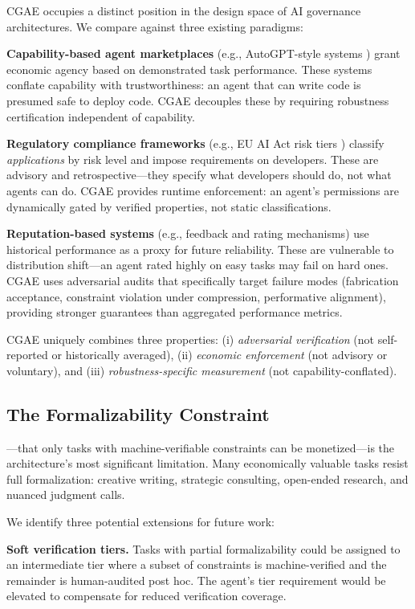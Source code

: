 \documentclass[11pt,a4paper]{article}
\begin{document}
CGAE occupies a distinct position in the design space of AI governance architectures. We compare against three existing paradigms:

\textbf{Capability-based agent marketplaces} (e.g., AutoGPT-style systems \citep{wu2023autogen}) grant economic agency based on demonstrated task performance. These systems conflate capability with trustworthiness: an agent that can write code is presumed safe to deploy code. CGAE decouples these by requiring robustness certification independent of capability.

\textbf{Regulatory compliance frameworks} (e.g., EU AI Act risk tiers \citep{euaiact2024}) classify \emph{applications} by risk level and impose requirements on developers. These are advisory and retrospective---they specify what developers should do, not what agents can do. CGAE provides runtime enforcement: an agent's permissions are dynamically gated by verified properties, not static classifications.

\textbf{Reputation-based systems} (e.g., feedback and rating mechanisms) use historical performance as a proxy for future reliability. These are vulnerable to distribution shift---an agent rated highly on easy tasks may fail on hard ones. CGAE uses adversarial audits that specifically target failure modes (fabrication acceptance, constraint violation under compression, performative alignment), providing stronger guarantees than aggregated performance metrics.

CGAE uniquely combines three properties: (i) \emph{adversarial verification} (not self-reported or historically averaged), (ii) \emph{economic enforcement} (not advisory or voluntary), and (iii) \emph{robustness-specific measurement} (not capability-conflated).

\subsection{The Formalizability Constraint}

---that only tasks with machine-verifiable constraints can be monetized---is the architecture's most significant limitation. Many economically valuable tasks resist full formalization: creative writing, strategic consulting, open-ended research, and nuanced judgment calls.

We identify three potential extensions for future work:

\textbf{Soft verification tiers.} Tasks with partial formalizability could be assigned to an intermediate tier where a subset of constraints is machine-verified and the remainder is human-audited post hoc. The agent's tier requirement would be elevated to compensate for reduced verification coverage.
\end{document}
